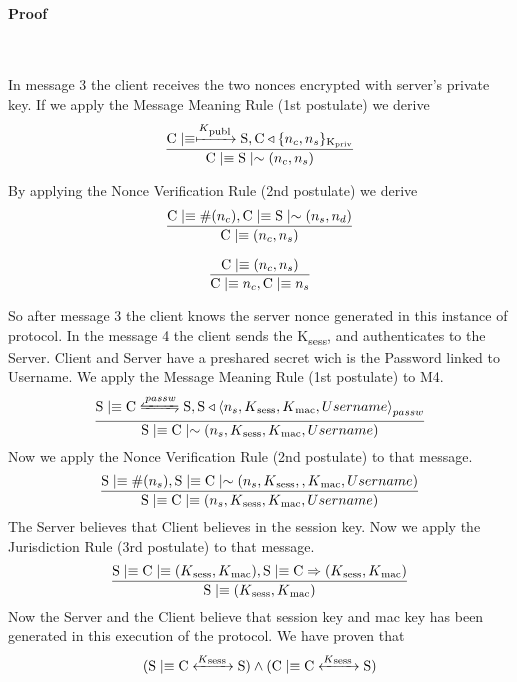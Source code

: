 \paragraph{Proof}\mbox{} \\
\par In message 3 the client receives the two nonces encrypted with server's private key. If we apply the Message Meaning Rule (1st postulate) we derive
\[ \frac{\textnormal{C} \mid\equiv \xmapsto{K\textsubscript{publ}} \textnormal{S}, 	\textnormal{C} \triangleleft \lbrace n_c,n_s \rbrace \textsubscript{K\textsubscript{priv}}}
        {\textnormal{C} \mid\equiv \textnormal{S} \mid\sim (n_c,n_s)}  \]

By applying the Nonce Verification Rule (2nd postulate) we derive
\[ \frac{\textnormal{C} \mid\equiv \#(n_c), \textnormal{C} \mid\equiv \textnormal{S} \mid\sim (n_s,n_d)}{\textnormal{C} \mid\equiv (n_c,n_s)} \]

\[ \frac{\textnormal{C} \mid\equiv (n_c,n_s)}{\textnormal{C} \mid\equiv n_c, \textnormal{C} \mid\equiv n_s} \]

So after message 3 the client knows the server nonce generated in this instance of protocol. In the message 4 the client sends the K\textsubscript{sess}, and authenticates to the Server. Client and Server have a preshared secret wich is the Password linked to Username. We apply the Message Meaning Rule (1st postulate) to M4.
\[ \frac{\textnormal{S} \believes \textnormal{C} \secret{passw} \textnormal{S}, \textnormal{S} \sees \combine{n_s,K\textsubscript{sess},K\textsubscript{mac},Username}{passw}}{\textnormal{S}\believes \textnormal{C} \oncesaid (n_s,K\textsubscript{sess},K\textsubscript{mac},Username)} \]
Now we apply the Nonce Verification Rule (2nd postulate) to that message.
\[ \frac{\textnormal{S}\mid\equiv \#(n_s), \textnormal{S} \mid\equiv \textnormal{C} \mid\sim (n_s,K\textsubscript{sess},,K\textsubscript{mac},Username)}
   {\textnormal{S} \mid\equiv \textnormal{C} \mid\equiv (n_s,K\textsubscript{sess},K\textsubscript{mac},Username)}	\]
The Server believes that Client believes in the session key. Now we apply the Jurisdiction Rule (3rd postulate) to that message.
\[ \frac{\textnormal{S} \mid\equiv \textnormal{C} \mid\equiv (K\textsubscript{sess},K\textsubscript{mac}), \textnormal{S} \mid\equiv \textnormal{C} \Rightarrow (K\textsubscript{sess},K\textsubscript{mac})}
        {\textnormal{S} \mid\equiv (K\textsubscript{sess},K\textsubscript{mac}) } \]
Now the Server and the Client believe that session key and mac key has been generated in this execution of the protocol. We have proven that
\[ (\textnormal{S} \mid\equiv \textnormal{C} \xleftrightarrow{K\textsubscript{sess }} \textnormal{S}) \wedge (\textnormal{C} \mid\equiv \textnormal{C} \xleftrightarrow{K\textsubscript{sess }} \textnormal{S}) \]

